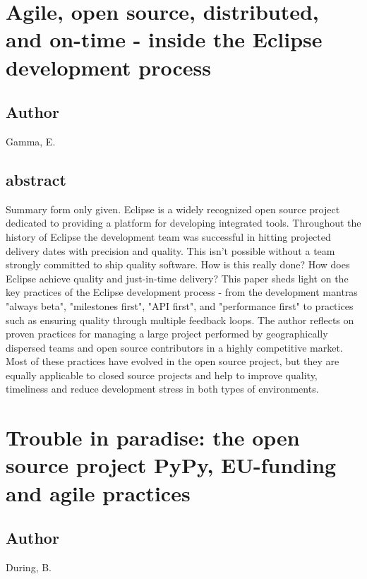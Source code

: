\documentclass[lnbip,sechang,a4paper]{svmultln}
\begin{document}
\section{Agile, open source, distributed, and on-time - inside the Eclipse
development process}
\subsection{Author}
Gamma, E.
\subsection{abstract}
Summary form only given. Eclipse is a widely recognized open source project
dedicated to providing a platform for developing integrated tools. Throughout
the history of Eclipse the development team was successful in hitting projected delivery dates with precision and quality. This isn't possible without a team strongly committed to ship quality software. How is this really done? How does Eclipse achieve quality and just-in-time delivery? This paper sheds light on the key practices of the Eclipse development process - from the development mantras "always beta", "milestones first", "API first", and "performance first" to practices such as ensuring quality through multiple feedback loops. The author reflects on proven practices for managing a large project performed by geographically dispersed teams and open source contributors in a highly competitive market. Most of these practices have evolved in the open source project, but they are equally applicable to closed source projects and help to improve quality, timeliness and reduce development stress in both types of environments.
\cite{1553528}
\section{Trouble in paradise: the open source project PyPy, EU-funding and agile
practices}
\subsection{Author}
During, B.
\end{document}
